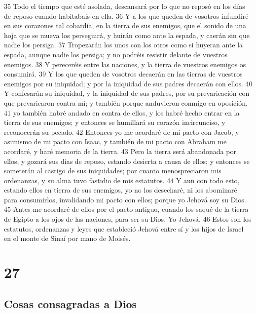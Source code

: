 35 Todo el tiempo que esté asolada, descansará por lo que no reposó en los días de reposo cuando habitabais en ella.
36 Y a los que queden de vosotros infundiré en sus corazones tal cobardía, en la tierra de sus enemigos, que el sonido de una hoja que se mueva los perseguirá, y huirán como ante la espada, y caerán sin que nadie los persiga.
37 Tropezarán los unos con los otros como si huyeran ante la espada, aunque nadie los persiga; y no podréis resistir delante de vuestros enemigos.
38 Y pereceréis entre las naciones, y la tierra de vuestros enemigos os consumirá.
39 Y los que queden de vosotros decaerán en las tierras de vuestros enemigos por su iniquidad; y por la iniquidad de sus padres decaerán con ellos.
40 Y confesarán su iniquidad, y la iniquidad de sus padres, por su prevaricación con que prevaricaron contra mí; y también porque anduvieron conmigo en oposición,
41 yo también habré andado en contra de ellos, y los habré hecho entrar en la tierra de sus enemigos; y entonces se humillará su corazón incircunciso, y reconocerán su pecado.
42 Entonces yo me acordaré de mi pacto con Jacob, y asimismo de mi pacto con Isaac, y también de mi pacto con Abraham me acordaré, y haré memoria de la tierra.
43 Pero la tierra será abandonada por ellos, y gozará sus días de reposo, estando desierta a causa de ellos; y entonces se someterán al castigo de sus iniquidades; por cuanto menospreciaron mis ordenanzas, y su alma tuvo fastidio de mis estatutos.
44 Y aun con todo esto, estando ellos en tierra de sus enemigos, yo no los desecharé, ni los abominaré para consumirlos, invalidando mi pacto con ellos; porque yo Jehová soy su Dios.
45 Antes me acordaré de ellos por el pacto antiguo, cuando los saqué de la tierra de Egipto a los ojos de las naciones, para ser su Dios. Yo Jehová.
46 Estos son los estatutos, ordenanzas y leyes que estableció Jehová entre sí y los hijos de Israel en el monte de Sinaí por mano de Moisés.

\chapter{27}

\section*{Cosas consagradas a Dios}

